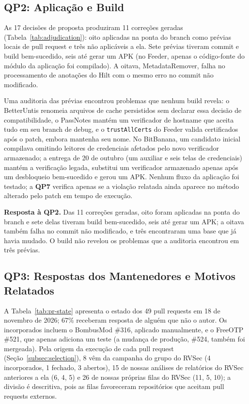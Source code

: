 \documentclass[conference]{IEEEtran}
\newcommand{\researchq}[1]{\textbf{QP#1}}
\begin{document}
\subsection{\researchq{2}: Aplicação e Build}
\label{subsec:rq2}

As 17 decisões de proposta produziram 11 correções geradas
(Tabela~\ref{tab:adjudication}): oito aplicadas na ponta do branch como prévias
locais de pull request e três não aplicáveis a ela. Sete prévias tiveram
commit e build bem-sucedido, seis até gerar um APK (no Feeder, apenas o código-fonte do módulo da aplicação
foi compilado). A oitava, MetadataRemover, falha no processamento de anotações
do Hilt com o mesmo erro no commit não modificado.

Uma auditoria das prévias encontrou problemas que nenhum build revela: o BetterUntis renomeia
arquivos de cache persistidos sem declarar essa decisão de compatibilidade, o PassNotes
mantém um verificador de hostname que aceita tudo em seu branch de debug, e o
\texttt{trustAllCerts} do Feeder valida certificados após o patch, embora mantenha
seu nome. No BitBanana, um candidato inicial compilava omitindo leitores de credenciais
afetados pelo novo verificador armazenado; a entrega de 20 de outubro (um
auxiliar e seis telas de credenciais) mantém a verificação legada, substitui um
verificador armazenado apenas após um desbloqueio bem-sucedido e gerou um APK. Nenhum
fluxo da aplicação foi testado; a \researchq{7} verifica apenas se a violação
relatada ainda aparece no método alterado pelo patch em tempo de execução.

\textbf{Resposta à \researchq{2}.} Das 11 correções geradas, oito foram aplicadas
na ponta do branch e sete delas tiveram build bem-sucedido, seis até gerar um APK;
a oitava também falha no commit não modificado, e três encontraram uma base que
já havia mudado. O build
não revelou os problemas que a auditoria encontrou em três prévias.

\subsection{\researchq{3}: Respostas dos Mantenedores e Motivos Relatados}
\label{subsec:rq3}

A Tabela~\ref{tab:pr-state} apresenta o estado dos 49 pull requests em 18 de
novembro de 2026; 67\% receberam resposta de alguém que não o autor. Os
incorporados incluem o BombusMod \#316, aplicado manualmente, e o FreeOTP \#521,
que apenas adiciona um teste (a mudança de produção, \#524, também foi mergeada).
Pela origem da execução de cada pull request (Seção~\ref{subsec:selection}), 8
vêm da campanha do grupo do RVSec (4 incorporados, 1 fechado, 3 abertos), 15 de
nossas análises de relatórios do RVSec anteriores a ela (6, 4, 5) e 26 de
nossas próprias filas do RVSec (11, 5, 10); a divisão é descritiva, pois as
filas favoreceram repositórios que aceitam pull requests externos.
\end{document}
